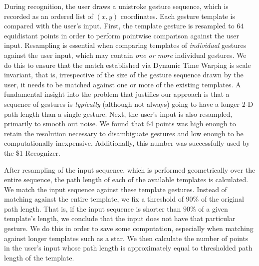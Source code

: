 \documentclass[twoside]{article}
\begin{document}
\begin{multicols}{2}
During recognition, the user draws a unistroke gesture sequence, which is
recorded as an ordered list of $(x,y)$ coordinates. Each gesture template is
compared with the user's input. First, the template gesture is resampled to $64$
equidistant points in order to perform pointwise comparison against the user
input. Resampling is essential when comparing templates of \emph{individual}
gestures against the user input, which may contain \emph{one or more} individual
gestures. We do this to ensure that the match established via Dynamic Time Warping is
scale invariant, that is, irrespective of the size of the gesture sequence drawn by the user, 
it needs to be matched against one or more of the existing templates. 
A fundamental insight into the problem that justifies our approach is
that a sequence of gestures is \emph{typically} (although not always) going to
have a longer 2-D path length than a single gesture. Next, the user's input is
also resampled, primarily to smooth out noise. We found that $64$ points was
high enough to retain the resolution necessary to disambiguate gestures and low
enough to be computationally inexpensive. Additionally, this number was
successfully used by the \$1 Recognizer\cite{wobbrock2007gestures}.

After resampling of the input sequence, which is performed geometrically over
the entire sequence, the path length of each of the available templates is calculated.
We match the input sequence against these template gestures. Instead of matching
against the entire template, we fix a threshold of $90\%$ of the original path length.
That is, if the input sequence is shorter than $90\%$ of a given template's length,
we conclude that the input does not have that particular gesture. We do this in order to save some
computation, especially when matching against longer templates such as a star. We then calculate the
number of points in the user's input whose path length is approximately equal to thresholded
path length of the template.

\end{multicols}
\end{document}
